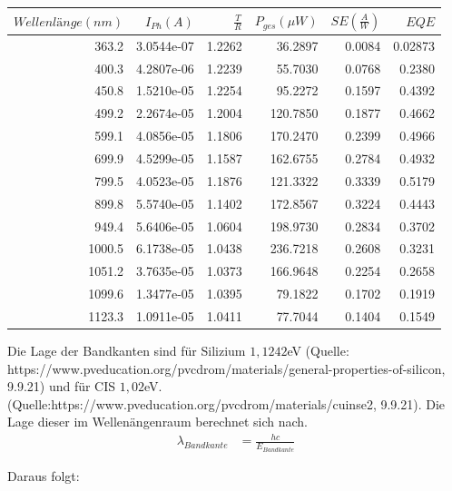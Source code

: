 \begin{center}
\begin{tabular}{rrrrrr}
    $Wellenlänge (nm)$ &  $I_{Ph} (A)$ &    $\frac{T}{R}$ &  $P_{ges} (\mu W)$ &  $SE (\frac{A}{W})$ &       $EQE$ \\
    \hline
    363.2 &  3.0544e-07 &  1.2262 &    36.2897 &  0.0084 &  0.02873 \\
    400.3 &  4.2807e-06 &  1.2239 &    55.7030 &  0.0768 &   0.2380 \\
    450.8 &  1.5210e-05 &  1.2254 &    95.2272 &  0.1597 &   0.4392 \\
    499.2 &  2.2674e-05 &  1.2004 &   120.7850 &  0.1877 &   0.4662 \\
    599.1 &  4.0856e-05 &  1.1806 &   170.2470 &  0.2399 &   0.4966 \\
    699.9 &  4.5299e-05 &  1.1587 &   162.6755 &  0.2784 &   0.4932 \\
    799.5 &  4.0523e-05 &  1.1876 &   121.3322 &  0.3339 &    0.5179 \\
    899.8 &  5.5740e-05 &  1.1402 &   172.8567 &  0.3224 &   0.4443 \\
    949.4 &  5.6406e-05 &  1.0604 &   198.9730 &  0.2834 &   0.3702 \\
    1000.5 &  6.1738e-05 &  1.0438 &   236.7218 &  0.2608 &   0.3231 \\
    1051.2 &  3.7635e-05 &  1.0373 &   166.9648 &  0.2254 &   0.2658 \\
    1099.6 &  1.3477e-05 &  1.0395 &    79.1822 &  0.1702 &   0.1919 \\
    1123.3 &  1.0911e-05 &  1.0411 &    77.7044 &  0.1404 &   0.1549 \\
\end{tabular}
\label{tab:32cis}
\end{center}

Die Lage der Bandkanten sind für Silizium $1,1242$eV (Quelle: https://www.pveducation.org/pvcdrom/materials/general-properties-of-silicon, 9.9.21) und für CIS $1,02$eV. (Quelle:https://www.pveducation.org/pvcdrom/materials/cuinse2, 9.9.21). Die Lage dieser im Wellenängenraum berechnet sich nach. \\

\begin{align}
\lambda_{Bandkante} &= \frac{hc}{E_{Bandkante}}
\end{align}

Daraus folgt: \\

